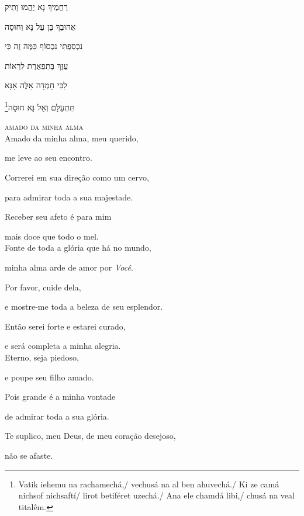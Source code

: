 רַחֲמֶיךָ נָא יֶהֱמוּ וָתִיק

אֲהוּבֶךָ בֵּן עַל נָּא וְחוּסָה

נִכְסַפְתִּי נִכְסוֹף כַּמֶּה זֶה כִּי

עֻזֶּךָ בְּתִפְאֶרֶת לִרְאוֹת

לִבִּי חָמְדָה אֵלֶּה אָנָּא

\footnote{Vatik iehemu na rachamechá,/ vechusá na al ben ahuvechá./ Ki ze camá nichsof nichsaftí/ lirot betiféret uzechá./ Ana ele chamdá libi,/ chusá na veal titalêm.}תִּתְעַלָּם וְאַל נָּא חוּסָה\\[10pt]



\movetooddpage
\raggedright

\vspace*{1cm}

\textsc{amado da minha alma}\\[15pt]

Amado da minha alma, meu querido,

me leve ao seu encontro.

Correrei em sua direção como um cervo,

para admirar toda a sua majestade.

Receber seu afeto é para mim

mais doce que todo o mel.\\[10pt]

Fonte de toda a glória que há no mundo,

minha alma arde de amor por \emph{Você}.

Por favor, cuide dela,

e mostre-me toda a beleza de seu esplendor.

Então serei forte e estarei curado,

e será completa a minha alegria.\\[10pt]

Eterno, seja piedoso,

e poupe seu filho amado.

Pois grande é a minha vontade

de admirar toda a sua glória.

Te suplico, meu Deus, de meu coração desejoso,

não se afaste.\\[10pt]



\movetoevenpage
\raggedleft %

\vspace*{1cm}


